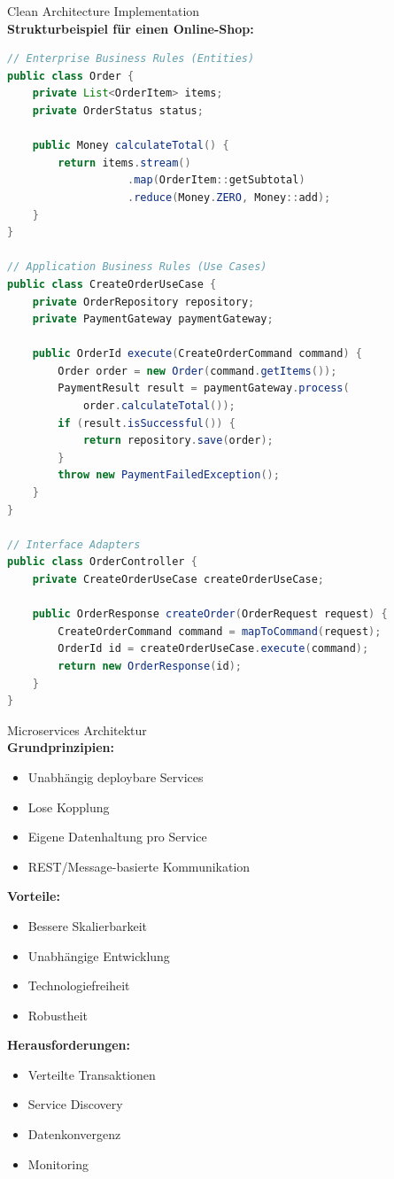 \begin{example2}{Clean Architecture Implementation}\\
\textbf{Strukturbeispiel für einen Online-Shop:}

\begin{lstlisting}[language=Java, style=basesmol]
// Enterprise Business Rules (Entities)
public class Order {
    private List<OrderItem> items;
    private OrderStatus status;
    
    public Money calculateTotal() {
        return items.stream()
                   .map(OrderItem::getSubtotal)
                   .reduce(Money.ZERO, Money::add);
    }
}

// Application Business Rules (Use Cases)
public class CreateOrderUseCase {
    private OrderRepository repository;
    private PaymentGateway paymentGateway;
    
    public OrderId execute(CreateOrderCommand command) {
        Order order = new Order(command.getItems());
        PaymentResult result = paymentGateway.process(
            order.calculateTotal());
        if (result.isSuccessful()) {
            return repository.save(order);
        }
        throw new PaymentFailedException();
    }
}

// Interface Adapters
public class OrderController {
    private CreateOrderUseCase createOrderUseCase;
    
    public OrderResponse createOrder(OrderRequest request) {
        CreateOrderCommand command = mapToCommand(request);
        OrderId id = createOrderUseCase.execute(command);
        return new OrderResponse(id);
    }
}
\end{lstlisting}
\end{example2}

\begin{concept}{Microservices Architektur}\\
\textbf{Grundprinzipien:}
\begin{itemize}
    \item Unabhängig deploybare Services
    \item Lose Kopplung
    \item Eigene Datenhaltung pro Service
    \item REST/Message-basierte Kommunikation
\end{itemize}

\textbf{Vorteile:}
\begin{itemize}
    \item Bessere Skalierbarkeit
    \item Unabhängige Entwicklung
    \item Technologiefreiheit
    \item Robustheit
\end{itemize}

\textbf{Herausforderungen:}
\begin{itemize}
    \item Verteilte Transaktionen
    \item Service Discovery
    \item Datenkonvergenz
    \item Monitoring
\end{itemize}
\end{concept}


